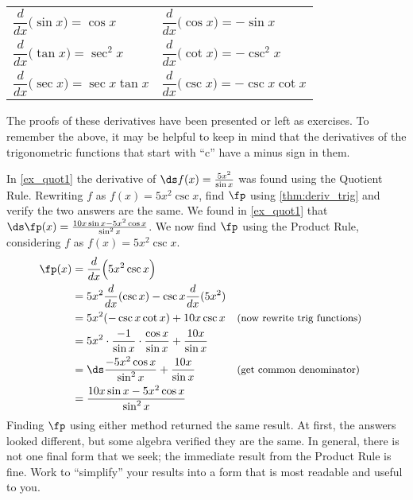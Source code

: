 \begin{theorem}\label{thm:deriv_trig}
\begin{anywhereenum}
\renewcommand{\arraystretch}{2.2}
	\begin{tabular}{ll}
		\item	$\dfrac{d}{dx}\big(\sin x\big) = \cos x$ &
		\item	$\dfrac{d}{dx}\big(\cos x\big) = -\sin x$ \\
		\item	$\dfrac{d}{dx}\big(\tan x\big) = \sec^2 x$ \qquad\quad\null&
		\item	$\dfrac{d}{dx}\big(\cot x\big) = -\csc^2 x$ \\
		\item	$\dfrac{d}{dx}\big(\sec x\big) = \sec x\tan x$ &
		\item	$\dfrac{d}{dx}\big(\csc x\big) = -\csc x\cot x$
	\end{tabular}
\end{anywhereenum}
\end{theorem}

The proofs of these derivatives have been presented or left as exercises. To remember the above, it may be helpful to keep in mind that the derivatives of the trigonometric functions that start with ``c'' have a minus sign in them.

\begin{example}\label{ex_prod_quot}
In \autoref{ex_quot1} the derivative of $\ds f(x) = \frac{5x^2}{\sin x}$ was found using the Quotient Rule. Rewriting $f$ as $f(x) = 5x^2\csc x$, find $\fp$ using \autoref{thm:deriv_trig} and verify the two answers are the same.
\solution
We found in \autoref{ex_quot1} that $\ds \fp(x) = \frac{10x\sin x - 5x^2\cos x}{\sin^2 x}$. We now find $\fp$ using the Product Rule, considering $f$ as $f(x) = 5x^2\csc x$.
\begin{align*}
	\fp(x)
	&= \frac{d}{dx}\Big(5x^2\csc x\Big) \\
	& = 5x^2 \frac{d}{dx} (\csc x) - \csc x \frac{d}{dx}(5x^2) \\
	&= 5x^2(-\csc x\cot x) + 10x\csc x && \text{\small (now rewrite trig functions)}\\
	&= 5x^2\cdot \frac{-1}{\sin x}\cdot \frac{\cos x}{\sin x} + \frac{10x}{\sin x}\\
	&= \ds\frac{-5x^2\cos x}{\sin ^2x}+\frac{10x}{\sin x} && \text{\small (get common denominator)}\\
	&= \frac{10x\sin x - 5x^2\cos x}{\sin^2x}
\end{align*}
Finding $\fp$ using either method returned the same result. At first, the answers looked different, but some algebra verified they are the same. In general, there is not one final form that we seek; the immediate result from the Product Rule is fine. Work to ``simplify\primeskip'' your results into a form that is most readable and useful to you.
\end{example}

